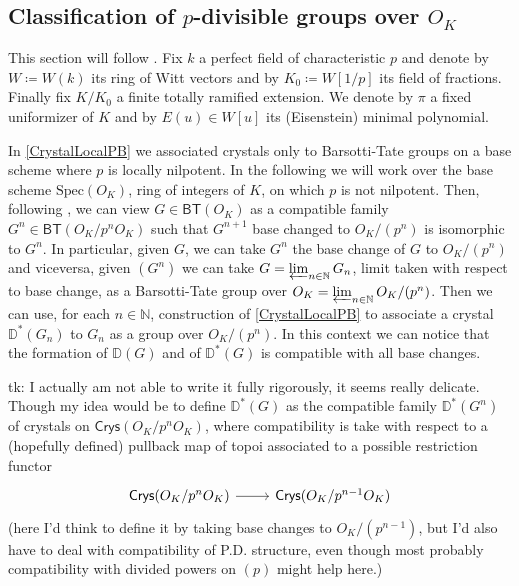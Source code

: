 


\subsection{Classification of \texorpdfstring{$p$}{p}-divisible groups
	over \texorpdfstring{$O_{ K }$}{the ring of integers of K}}
This section will follow \cite[Appendix A]{Kisin}.
Fix $k$ a perfect field of characteristic $p$ and denote by
$W \coloneqq W(k)$ its ring of Witt vectors and by $K_0 \coloneqq W[1/p]$
its field of fractions.
Finally fix $K/K_0$ a finite totally ramified extension.
We denote by $\pi$ a fixed uniformizer of $K$ and by $E(u) \in W[u]$
its (Eisenstein) minimal polynomial.


\begin{rem}[]
	In \cref{CrystalLocalPB} we associated crystals
	only to Barsotti-Tate groups on a base scheme where
	$p$ is locally nilpotent.
	In the following we will work over the base scheme
	$\mathrm{Spec}(O_K)$, ring of integers of $K$, on which $p$ is not nilpotent.
	Then, following \cite[\S 2.4.2]{deJong}, we can view $G \in \mathsf{BT}(O_K)$
	as a compatible family $G^n \in \mathsf{BT}(O_K/p^nO_K)$
	such that $G^{n+1}$ base changed to $O_K/ (p^n)$ is isomorphic
	to $G^n$.
	In particular, given $G$, we can take $G^n$ the base change of $G$ to
	$O_K/ (p^n)$ and viceversa, given $\left( G^n \right)$ we can 
	take $G = \varprojlim_{n \in \mathbb{N}} G_n$, limit taken with respect to base change,
	as a Barsotti-Tate group over $O_K = \varprojlim_{n \in \mathbb{N}} O_K/ (p^n)$.
	Then we can use, for each $n \in \mathbb{N}$, construction of \cref{CrystalLocalPB}
	to associate a crystal $\mathbb{D}^*(G_n)$ to $G_n$ as a group over $O_K/ (p^n)$.
	In this context we can notice that the
	formation of $\mathbb{D}(G)$ and of $\mathbb{D}^*(G)$ is compatible
	with all base changes. %


	tk: I actually am not able to write it fully rigorously, it seems really delicate.
	Though my idea would be to define $\mathbb{D}^*(G)$ as the compatible family
	$\mathbb{D}^*(G^n)$ of crystals on $\mathsf{Crys}(O_K/p^nO_K)$,
	where compatibility is take with respect to a (hopefully defined) pullback map
	of topoi associated to a possible restriction functor
	\begin{equation*}
	\begin{tikzcd}
		\mathsf{Crys}(O_K/p^nO_K) \arrow[r, "", rightarrow] &
		\mathsf{Crys}(O_K/p^{n-1}O_K)
	\end{tikzcd}
	\end{equation*}
	(here I'd think to define it by taking base changes to $O_K/ (p^{n-1})$,
	but I'd also have to deal with compatibility of P.D. structure,
	even though most probably compatibility with divided powers on $(p)$
	might help here.)
\end{rem}


